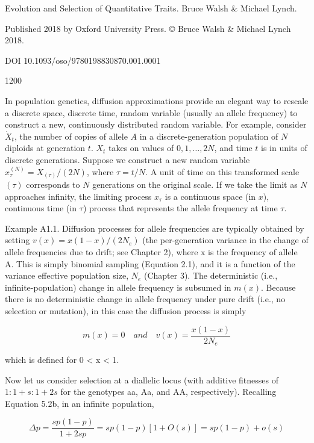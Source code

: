 \documentclass{article}
\begin{document}
Evolution and Selection of Quantitative Traits. Bruce Walsh & Michael Lynch.

Published 2018 by Oxford University Press. © Bruce Walsh & Michael Lynch 2018.

DOI 10.1093/oso/9780198830870.001.0001

1200

In population genetics, diffusion approximations provide an elegant way to rescale a discrete space, discrete time, random variable (usually an allele frequency) to construct a new, continuously distributed random variable. For example, consider  $ \dot{X}_t $, the number of copies of allele  $ A $ in a discrete-generation population of  $ N $ diploids at generation  $ t $.  $ X_t $ takes on values of  $ 0, 1, \ldots, 2N $, and time  $ t $ is in units of discrete generations. Suppose we construct a new random variable  $ x_\tau^{(N)} = X_{(\tau)}/(2N) $, where  $ \tau = t/N $. A unit of time on this transformed scale  $ (\tau) $ corresponds to  $ N $ generations on the original scale. If we take the limit as  $ N $ approaches infinity, the limiting process  $ x_\tau $ is a continuous space (in  $ x $), continuous time (in  $ \tau $) process that represents the allele frequency at time  $ \tau $.

Example A1.1. Diffusion processes for allele frequencies are typically obtained by setting  $ v(x) = x(1 - x)/(2N_e) $ (the per-generation variance in the change of allele frequencies due to drift; see Chapter 2), where x is the frequency of allele A. This is simply binomial sampling (Equation 2.1), and it is a function of the variance effective population size,  $ N_e $ (Chapter 3). The deterministic (i.e., infinite-population) change in allele frequency is subsumed in  $ m(x) $. Because there is no deterministic change in allele frequency under pure drift (i.e., no selection or mutation), in this case the diffusion process is simply

\begin{equation}
m(x)=0\quad and\quad v(x)=\frac{x(1-x)}{2N_{e}}
\end{equation}

which is defined for 0 < x < 1.

Now let us consider selection at a diallelic locus (with additive fitnesses of  $ 1:1+s:1+2s $ for the genotypes aa, Aa, and AA, respectively). Recalling Equation 5.2b, in an infinite population,

\begin{equation}
\Delta p=\frac{sp(1-p)}{1+2sp}=sp(1-p)[1+O(s)]=sp(1-p)+o(s)
\end{equation}
\end{document}
